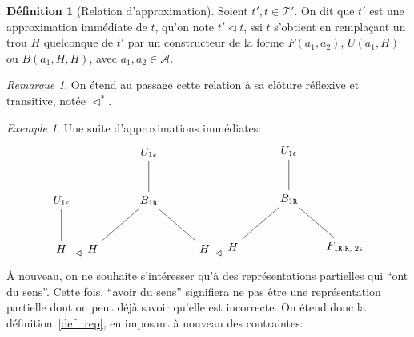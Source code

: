 \documentclass[11pt,a4paper]{article}
\theoremstyle{plain}
\theoremstyle{definition}
\newtheorem{definition}{Définition}
\theoremstyle{remark}
\newtheorem{remark}{Remarque}
\newtheorem{example}{Exemple}
\newcommand*{\Right}{\textnormal{\texttt{R}}}
\newcommand*{\addresses}{\ensuremath{\mathcal{A}}}
\newcommand*{\treespartial}{\ensuremath{\mathcal{T'}}}
\newcommand*{\relapprox}{\ensuremath{\triangleleft}}
\newcommand*{\relapproxlarge}{\ensuremath{\relapprox^*}}
\newcommand*{\unknown}{H}
\begin{document}
\begin{definition}[Relation d'approximation]
    Soient $t', t \in \treespartial$. On dit que $t'$ est une approximation immédiate de $t$, qu'on note $t' \relapprox t$, ssi $t$ s'obtient en remplaçant un trou $\unknown$ quelconque de $t'$ par un constructeur de la forme $F(a_1, a_2)$, $U(a_1, \unknown)$ ou $B(a_1, \unknown, \unknown)$, avec $a_1, a_2 \in \addresses$.
\end{definition}

\begin{remark}
    On étend au passage cette relation à sa clôture réflexive et transitive, notée $\relapproxlarge$.
\end{remark}

\begin{example}
Une suite d'approximations immédiates:
    \begin{equation*}
    \begin{tikzpicture}%
        [level 2/.style={sibling distance=3.5cm}]
        \node {$U_{1 \epsilon}$}
        child {node {$\unknown$}};
    \end{tikzpicture}
    \relapprox
    \begin{tikzpicture}%
        [level 2/.style={sibling distance=3.5cm}]
        \node {$U_{1 \epsilon}$}
        child {node {$B_{1 \Right}$}
            child {node {$\unknown$}}
            child {node {$\unknown$}}
        };
    \end{tikzpicture}
    \relapprox
    \begin{tikzpicture}%
        [level 2/.style={sibling distance=3.5cm}]
        \node {$U_{1 \epsilon}$}
        child {node {$B_{1 \Right}$}
            child {node {$\unknown$}}
            child {node {$F_{1 \Right \cdot \Right, \; 2 \epsilon}$}}
        };
    \end{tikzpicture}
    \end{equation*}
\end{example}

À nouveau, on ne souhaite s'intéresser qu'à des représentations partielles qui ``ont du sens''. Cette fois, ``avoir du sens'' signifiera ne pas être une représentation partielle dont on peut déjà savoir qu'elle est incorrecte. On étend donc la définition~\ref{def_rep}, en imposant à nouveau des contraintes:
\end{document}
